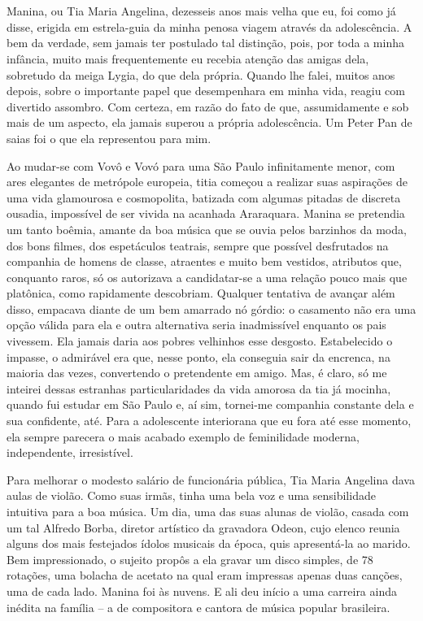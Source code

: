 \chapter{}
Manina, ou Tia Maria Angelina, dezesseis anos mais velha que eu, foi como já disse, erigida em estrela-guia da minha penosa viagem através da adolescência.
A bem da verdade, sem jamais ter postulado tal distinção, pois, por toda a minha infância, muito mais frequentemente eu recebia atenção das amigas dela, sobretudo da meiga Lygia, do que dela própria.
Quando lhe falei, muitos anos depois, sobre o importante papel que desempenhara em minha vida, reagiu com divertido assombro.
Com certeza, em razão do fato de que, assumidamente e sob mais de um aspecto, ela jamais superou a própria adolescência.
Um Peter Pan de saias foi o que ela representou para mim.

Ao mudar-se com Vovô e Vovó para uma São Paulo infinitamente menor, com ares elegantes de metrópole europeia, titia começou a realizar suas aspirações de uma vida glamourosa e cosmopolita, batizada com algumas pitadas de discreta ousadia, impossível de ser vivida na acanhada Araraquara.
Manina se pretendia um tanto boêmia, amante da boa música que se ouvia pelos barzinhos da moda, dos bons filmes, dos espetáculos teatrais, sempre que possível desfrutados na companhia de homens de classe, atraentes e muito bem vestidos, atributos que, conquanto raros, só os autorizava a candidatar-se a uma relação pouco mais que platônica, como rapidamente descobriam.
Qualquer tentativa de avançar além disso, empacava diante de um bem amarrado nó górdio: o casamento não era uma opção válida para ela e outra alternativa seria inadmissível enquanto os pais vivessem.
Ela jamais daria aos pobres velhinhos esse desgosto.
Estabelecido o impasse, o admirável era que, nesse ponto, ela conseguia sair da encrenca, na maioria das vezes, convertendo o pretendente em amigo.
Mas, é claro, só me inteirei dessas estranhas particularidades da vida amorosa da tia já mocinha, quando fui estudar em São Paulo e, aí sim, tornei-me companhia constante dela e sua confidente, até.
Para a adolescente interiorana que eu fora até esse momento, ela sempre parecera o mais acabado exemplo de feminilidade moderna, independente, irresistível.


Para melhorar o modesto salário de funcionária pública, Tia Maria Angelina dava aulas de violão.
Como suas irmãs, tinha uma bela voz e uma sensibilidade intuitiva para a boa música.
Um dia, uma das suas alunas de violão, casada com um tal Alfredo Borba, diretor artístico da gravadora Odeon, cujo elenco reunia alguns dos mais festejados ídolos musicais da época, quis apresentá-la ao marido.
Bem impressionado, o sujeito propôs a ela gravar um disco simples, de 78 rotações, uma bolacha de acetato na qual eram impressas apenas duas canções, uma de cada lado.
Manina foi às nuvens.
E ali deu início a uma carreira ainda inédita na família -- a de compositora e cantora de música popular brasileira.

